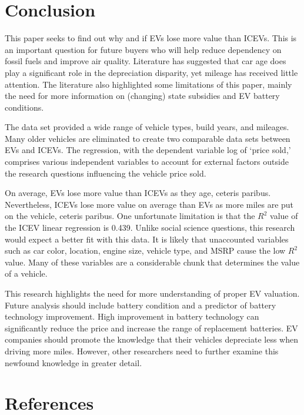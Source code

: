 \documentclass{article}
\begin{document}
\hypertarget{conclusion}{%
\section{Conclusion}\label{conclusion}}

This paper seeks to find out why and if EVs lose more value than ICEVs.
This is an important question for future buyers who will help reduce
dependency on fossil fuels and improve air quality. Literature has
suggested that car age does play a significant role in the depreciation
disparity, yet mileage has received little attention. The literature
also highlighted some limitations of this paper, mainly the need for
more information on (changing) state subsidies and EV battery
conditions.

The data set provided a wide range of vehicle types, build years, and
mileages. Many older vehicles are eliminated to create two comparable
data sets between EVs and ICEVs. The regression, with the dependent
variable log of `price sold,' comprises various independent variables to
account for external factors outside the research questions influencing
the vehicle price sold.

On average, EVs lose more value than ICEVs as they age, ceteris paribus.
Nevertheless, ICEVs lose more value on average than EVs as more miles
are put on the vehicle, ceteris paribus. One unfortunate limitation is
that the \(R^2\) value of the ICEV linear regression is 0.439. Unlike
social science questions, this research would expect a better fit with
this data. It is likely that unaccounted variables such as car color,
location, engine size, vehicle type, and MSRP cause the low \(R^2\)
value. Many of these variables are a considerable chunk that determines
the value of a vehicle.

This research highlights the need for more understanding of proper EV
valuation. Future analysis should include battery condition and a
predictor of battery technology improvement. High improvement in battery
technology can significantly reduce the price and increase the range of
replacement batteries. EV companies should promote the knowledge that
their vehicles depreciate less when driving more miles. However, other
researchers need to further examine this newfound knowledge in greater
detail.

\hypertarget{references}{%
\section*{References}\label{references}}
\end{document}
